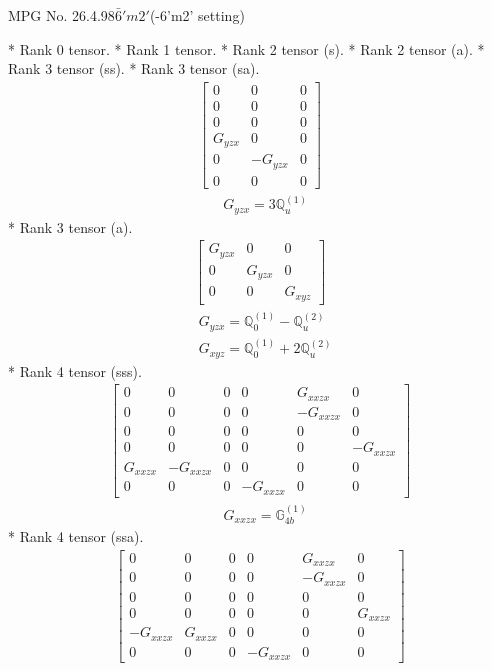 \documentclass[fleqn,8pt,landscape]{jsarticle}
\begin{document}
\setcounter{MaxMatrixCols}{32}

\renewcommand{\tablename}{Table~}
\renewcommand{\figurename}{Figure~}
\begin{center}
\LARGE
MPG No. 26.4.98\quad$\bar{6}'m2'$\quad(-6'm2' setting)
\end{center}
* Rank 0 tensor.
* Rank 1 tensor.
* Rank 2 tensor (s).
* Rank 2 tensor (a).
* Rank 3 tensor (ss).
* Rank 3 tensor (sa).
\begin{align*}
\begin{bmatrix} 0 & 0 & 0 \\ 0 & 0 & 0 \\ 0 & 0 & 0 \\ G_{yzx} & 0 & 0 \\ 0 & - G_{yzx} & 0 \\ 0 & 0 & 0 \end{bmatrix}
\end{align*}
\begin{align*}
& G_{yzx} = 3 \mathbb{Q}_{u}^{(1)}
\end{align*}
* Rank 3 tensor (a).
\begin{align*}
\begin{bmatrix} G_{yzx} & 0 & 0 \\ 0 & G_{yzx} & 0 \\ 0 & 0 & G_{xyz} \end{bmatrix}
\end{align*}
\begin{align*}
& G_{yzx} = \mathbb{Q}_{0}^{(1)} - \mathbb{Q}_{u}^{(2)} \\
& G_{xyz} = \mathbb{Q}_{0}^{(1)} + 2 \mathbb{Q}_{u}^{(2)}
\end{align*}
* Rank 4 tensor (sss).
\begin{align*}
\begin{bmatrix} 0 & 0 & 0 & 0 & G_{xxzx} & 0 \\ 0 & 0 & 0 & 0 & - G_{xxzx} & 0 \\ 0 & 0 & 0 & 0 & 0 & 0 \\ 0 & 0 & 0 & 0 & 0 & - G_{xxzx} \\ G_{xxzx} & - G_{xxzx} & 0 & 0 & 0 & 0 \\ 0 & 0 & 0 & - G_{xxzx} & 0 & 0 \end{bmatrix}
\end{align*}
\begin{align*}
& G_{xxzx} = \mathbb{G}_{4b}^{(1)}
\end{align*}
* Rank 4 tensor (ssa).
\begin{align*}
\begin{bmatrix} 0 & 0 & 0 & 0 & G_{xxzx} & 0 \\ 0 & 0 & 0 & 0 & - G_{xxzx} & 0 \\ 0 & 0 & 0 & 0 & 0 & 0 \\ 0 & 0 & 0 & 0 & 0 & G_{xxzx} \\ - G_{xxzx} & G_{xxzx} & 0 & 0 & 0 & 0 \\ 0 & 0 & 0 & - G_{xxzx} & 0 & 0 \end{bmatrix}
\end{align*}
\end{document}
